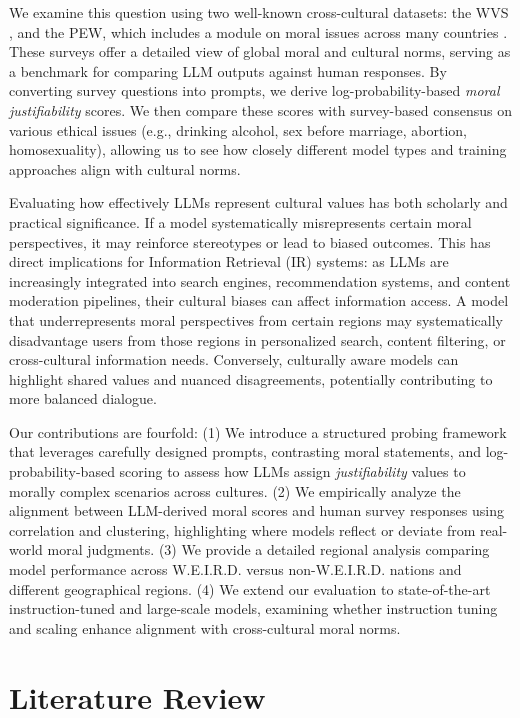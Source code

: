 \documentclass[a4paper,10pt,twoside]{article}
\begin{document}
We examine this question using two well-known cross-cultural datasets: the WVS \cite{Inglehart2014,Haerpfer2022}, and the PEW, which includes a module on moral issues across many countries \cite{Pew2023}. These surveys offer a detailed view of global moral and cultural norms, serving as a benchmark for comparing LLM outputs against human responses. By converting survey questions into prompts, we derive log-probability-based \emph{moral justifiability} scores. We then compare these scores with survey-based consensus on various ethical issues (e.g., drinking alcohol, sex before marriage, abortion, homosexuality), allowing us to see how closely different model types and training approaches align with cultural norms.

Evaluating how effectively LLMs represent cultural values has both scholarly and practical significance. If a model systematically misrepresents certain moral perspectives, it may reinforce stereotypes or lead to biased outcomes. This has direct implications for Information Retrieval (IR) systems: as LLMs are increasingly integrated into search engines, recommendation systems, and content moderation pipelines, their cultural biases can affect information access. A model that underrepresents moral perspectives from certain regions may systematically disadvantage users from those regions in personalized search, content filtering, or cross-cultural information needs. Conversely, culturally aware models can highlight shared values and nuanced disagreements, potentially contributing to more balanced dialogue.

Our contributions are fourfold: (1) We introduce a structured probing framework that leverages carefully designed prompts, contrasting moral statements, and log-probability-based scoring to assess how LLMs assign \emph{justifiability} values to morally complex scenarios across cultures. (2) We empirically analyze the alignment between LLM-derived moral scores and human survey responses using correlation and clustering, highlighting where models reflect or deviate from real-world moral judgments. (3) We provide a detailed regional analysis comparing model performance across W.E.I.R.D. versus non-W.E.I.R.D. nations and different geographical regions. (4) We extend our evaluation to state-of-the-art instruction-tuned and large-scale models, examining whether instruction tuning and scaling enhance alignment with cross-cultural moral norms.


\section{Literature Review}
\end{document}
